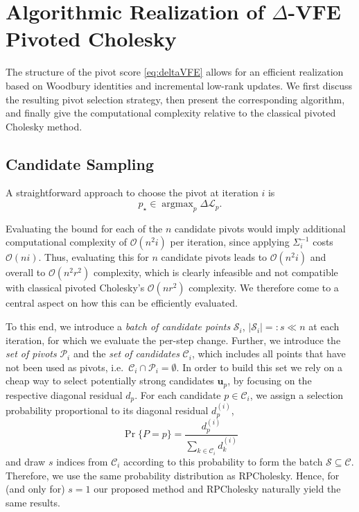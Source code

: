 \documentclass[onefignum,onetabnum]{siamart250211}
\DeclareMathOperator*{\argmax}{argmax}
\begin{document}
\section{Algorithmic Realization of $\Delta$-VFE Pivoted Cholesky}\label{sec:realization}

The structure of the pivot score \eqref{eq:deltaVFE} allows for an efficient realization based on Woodbury identities and incremental low-rank updates. We first discuss the resulting pivot selection strategy, then present the corresponding algorithm, and finally give the computational complexity relative to the classical pivoted Cholesky method.

\subsection{Candidate Sampling}

A straightforward approach to choose the pivot at iteration $i$ is
\begin{equation}
    p_\star \in \argmax_p \Delta\mathcal L_p.
\label{eq:pivot-rule}
\end{equation}

Evaluating the bound for each of the $n$ candidate pivots would imply additional computational complexity of $\mathcal{O}(n^2i)$ per iteration, since applying $\Sigma_i^{-1}$ costs $\mathcal{O}(ni)$. Thus, evaluating this for $n$ candidate pivots leads to $\mathcal{O}(n^2i)$ and overall to $\mathcal{O}(n^2r^2)$ complexity, which is clearly infeasible and not compatible with classical pivoted Cholesky's $\mathcal{O}(nr^2)$ complexity. We therefore come to a central aspect on how this can be efficiently evaluated. 

To this end, we introduce a \emph{batch of candidate points} $\mathcal{S}_i$, $|\mathcal{S}_i| =:s  \ll n$ at each iteration, for which we evaluate the per-step change. Further, we introduce the \emph{set of pivots} $\mathcal{P}_i$ and the \emph{set of candidates} $\mathcal{C}_i$, which includes all points that have not been used as pivots, i.e.~$\mathcal{C}_i \cap \mathcal{P}_i = \emptyset$. In order to build this set we rely on a cheap way to select potentially strong candidates $\bm{u}_p$, by focusing on the respective diagonal residual ${d}_p$. For each candidate $p \in \mathcal{C}_i$, we assign a selection probability proportional to its diagonal residual $d_p^{(i)}$,
\begin{equation}
    \Pr \{P = p\} = \frac{{d}_p^{(i)}}{\sum_{k\in\mathcal{C}_i} {d}_k^{(i)}}
\end{equation}
and draw $s$ indices from $\mathcal{C}_i$ according to this probability to form the batch $\mathcal{S} \subseteq \mathcal{C}$. Therefore, we use the same probability distribution as RPCholesky. Hence, for (and only for) $s=1$ our proposed method and RPCholesky naturally yield the same results.
\end{document}

